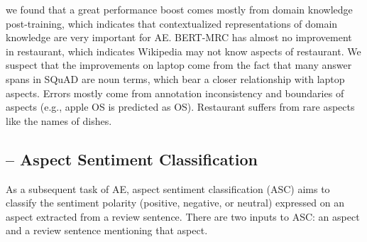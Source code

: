 \begin{table}[H]
    \centering
    \caption{BERT for AE in F1.}
\label{chap6:tbl:result_ae}
\vspace{-5mm}
\end{table}

we found that a great performance boost comes mostly from domain knowledge post-training, which indicates that contextualized representations of domain knowledge are very important for AE. BERT-MRC has almost no improvement in restaurant, which indicates Wikipedia may not know aspects of restaurant.
We suspect that the improvements on laptop come from the fact that many answer spans in SQuAD are noun terms, which bear a closer relationship with laptop aspects.
Errors mostly come from annotation inconsistency and boundaries of aspects (e.g., apple OS is predicted as OS). Restaurant suffers from rare aspects like the names of dishes.


\subsection{-- Aspect Sentiment Classification}

As a subsequent task of AE, aspect sentiment classification (ASC) aims to classify the sentiment polarity (positive, negative, or neutral) expressed on an aspect extracted from a review sentence.
There are two inputs to ASC: an aspect and a review sentence mentioning that aspect.

